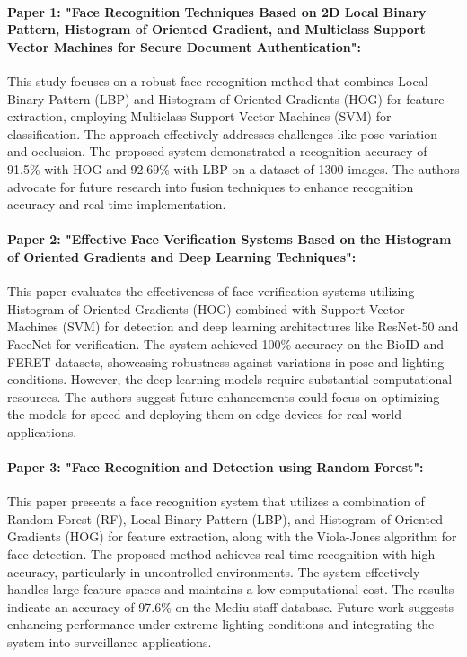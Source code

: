 \documentclass{article}
\begin{document}
\paragraph{Paper 1: "Face Recognition Techniques Based on 2D Local Binary Pattern, Histogram of Oriented Gradient, and Multiclass Support Vector Machines for Secure Document Authentication":} 
This study focuses on a robust face recognition method that combines Local Binary Pattern (LBP) and Histogram of Oriented Gradients (HOG) for feature extraction, employing Multiclass Support Vector Machines (SVM) for classification. The approach effectively addresses challenges like pose variation and occlusion. The proposed system demonstrated a recognition accuracy of 91.5\% with HOG and 92.69\% with LBP on a dataset of 1300 images. The authors advocate for future research into fusion techniques to enhance recognition accuracy and real-time implementation.

\paragraph{Paper 2: "Effective Face Verification Systems Based on the Histogram of Oriented Gradients and Deep Learning Techniques":} 
This paper evaluates the effectiveness of face verification systems utilizing Histogram of Oriented Gradients (HOG) combined with Support Vector Machines (SVM) for detection and deep learning architectures like ResNet-50 and FaceNet for verification. The system achieved 100\% accuracy on the BioID and FERET datasets, showcasing robustness against variations in pose and lighting conditions. However, the deep learning models require substantial computational resources. The authors suggest future enhancements could focus on optimizing the models for speed and deploying them on edge devices for real-world applications.

\paragraph{Paper 3: "Face Recognition and Detection using Random Forest":} 
This paper presents a face recognition system that utilizes a combination of Random Forest (RF), Local Binary Pattern (LBP), and Histogram of Oriented Gradients (HOG) for feature extraction, along with the Viola-Jones algorithm for face detection. The proposed method achieves real-time recognition with high accuracy, particularly in uncontrolled environments. The system effectively handles large feature spaces and maintains a low computational cost. The results indicate an accuracy of 97.6\% on the Mediu staff database. Future work suggests enhancing performance under extreme lighting conditions and integrating the system into surveillance applications.
\end{document}
